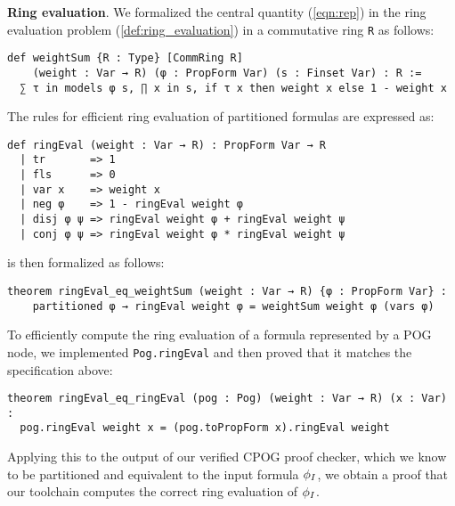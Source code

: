 \vspace{1em}\noindent
\textbf{Ring evaluation}. We formalized the central quantity (\ref{eqn:rep}) in the ring evaluation problem
(\cref{def:ring_evaluation}) in a commutative ring \lstinline{R} as follows:
\begin{lstlisting}
def weightSum {R : Type} [CommRing R]
    (weight : Var → R) (φ : PropForm Var) (s : Finset Var) : R :=
  ∑ τ in models φ s, ∏ x in s, if τ x then weight x else 1 - weight x
\end{lstlisting}
The rules for efficient ring evaluation of partitioned formulas are expressed as:
\begin{lstlisting}
def ringEval (weight : Var → R) : PropForm Var → R
  | tr       => 1
  | fls      => 0
  | var x    => weight x
  | neg φ    => 1 - ringEval weight φ
  | disj φ ψ => ringEval weight φ + ringEval weight ψ
  | conj φ ψ => ringEval weight φ * ringEval weight ψ
\end{lstlisting}
 is then formalized as follows:
\begin{lstlisting}
theorem ringEval_eq_weightSum (weight : Var → R) {φ : PropForm Var} :
    partitioned φ → ringEval weight φ = weightSum weight φ (vars φ)
\end{lstlisting}
To efficiently compute the ring evaluation of a formula represented by a POG node, we implemented
\lstinline{Pog.ringEval} and then proved that it matches the specification above:
\begin{lstlisting}
theorem ringEval_eq_ringEval (pog : Pog) (weight : Var → R) (x : Var) :
  pog.ringEval weight x = (pog.toPropForm x).ringEval weight
\end{lstlisting}
Applying this to the output of our verified CPOG proof checker, which we know to be partitioned
and equivalent to the input formula $\phi_I$, we obtain a proof that our toolchain computes
the correct ring evaluation of $\phi_I$.

